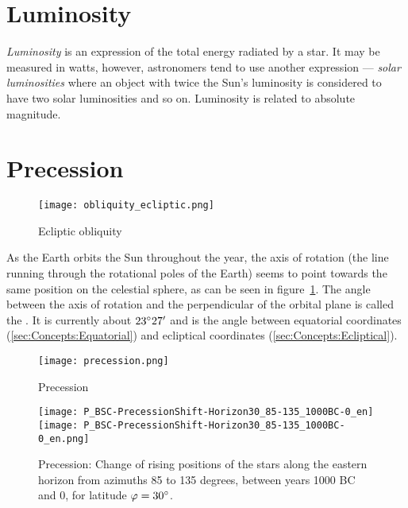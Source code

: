 \section{Luminosity}
\label{sec:Concepts:Luminosity}

\emph{Luminosity} is an expression of the total energy radiated by a
star. It may be measured in watts, however, astronomers tend to use
another expression --- \emph{solar luminosities} where an object with
twice the Sun's luminosity is considered to have two solar luminosities
and so on. Luminosity is related to absolute magnitude.

\section{Precession}
\label{sec:Concepts:Precession}

\begin{figure}[htb]
\centering\texttt{[image: obliquity\_ecliptic.png]}
\caption{Ecliptic obliquity}
\label{fig:Obliquity}
\end{figure}

As the Earth orbits the Sun throughout the year, the axis of rotation
(the line running through the rotational poles of the Earth) seems to
point towards the same position on the celestial sphere, as can be
seen in figure~\ref{fig:Obliquity}. The angle between the axis of
rotation and the perpendicular of the orbital plane is called the
. It is currently about
$23\degree27'$ and is the angle between equatorial coordinates
(\ref{sec:Concepts:Equatorial}) and ecliptical coordinates
(\ref{sec:Concepts:Ecliptical}).

\begin{figure}[p]
\centering\texttt{[image: precession.png]}
\caption{Precession}
\label{fig:Precession}
\end{figure}

\begin{figure}[p]
\centering
\ifpdf
\texttt{[image: P\_BSC-PrecessionShift-Horizon30\_85-135\_1000BC-0\_en]}
\else
\texttt{[image: P\_BSC-PrecessionShift-Horizon30\_85-135\_1000BC-0\_en.png]}
\fi
\caption{Precession: Change of rising positions of the stars along the
  eastern horizon from azimuths 85 to 135 degrees, between years 1000
  BC and 0, for latitude $\varphi=30\degree$.}
\label{fig:Precession:AzimuthShift}
\end{figure}




